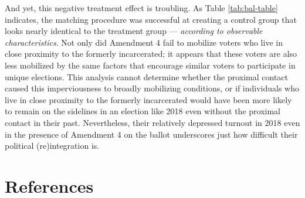 \documentclass[
  12pt,
]{article}
\begin{document}
And yet, this negative treatment effect is troubling. As Table \ref{tab:bal-table} indicates, the matching procedure was successful at creating a control group that looks nearly identical to the treatment group --- \emph{according to observable characteristics}. Not only did Amendment 4 fail to mobilize voters who live in close proximity to the formerly incarcerated; it appears that these voters are also less mobilized by the same factors that encourage similar voters to participate in unique elections. This analysis cannot determine whether the proximal contact caused this imperviousness to broadly mobilizing conditions, or if individuals who live in close proximity to the formerly incarcerated would have been more likely to remain on the sidelines in an election like 2018 even without the proximal contact in their past. Nevertheless, their relatively depressed turnout in 2018 even in the presence of Amendment 4 on the ballot underscores just how difficult their political (re)integration is.

\newpage

\hypertarget{references}{%
\section*{References}\label{references}}
\end{document}

